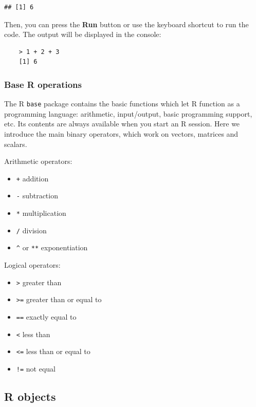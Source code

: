 \documentclass[
]{book}
\providecommand{\tightlist}{%
  \setlength{\itemsep}{0pt}\setlength{\parskip}{0pt}}
\begin{document}
\begin{verbatim}
## [1] 6
\end{verbatim}

Then, you can press the \textbf{Run} button or use the keyboard shortcut to run the code. The output will be displayed in the console:

\begin{verbatim}
    > 1 + 2 + 3
    [1] 6
\end{verbatim}

\hypertarget{base-r-operations}{%
\subsubsection{Base R operations}\label{base-r-operations}}

The R \texttt{base} package contains the basic functions which let R function as a programming language: arithmetic, input/output, basic programming support, etc. Its contents are always available when you start an R session. Here we introduce the main binary operators, which work on vectors, matrices and scalars.

Arithmetic operators:

\begin{itemize}
\tightlist
\item
  \texttt{+} addition
\item
  \texttt{-} subtraction
\item
  \texttt{*} multiplication
\item
  \texttt{/} division
\item
  \texttt{\^{}} or \texttt{**} exponentiation
\end{itemize}

Logical operators:

\begin{itemize}
\tightlist
\item
  \texttt{\textgreater{}} greater than
\item
  \texttt{\textgreater{}=} greater than or equal to
\item
  \texttt{==} exactly equal to
\item
  \texttt{\textless{}} less than
\item
  \texttt{\textless{}=} less than or equal to
\item
  \texttt{!=} not equal
\end{itemize}

\hypertarget{r-objects}{%
\subsection{R objects}\label{r-objects}}
\end{document}
